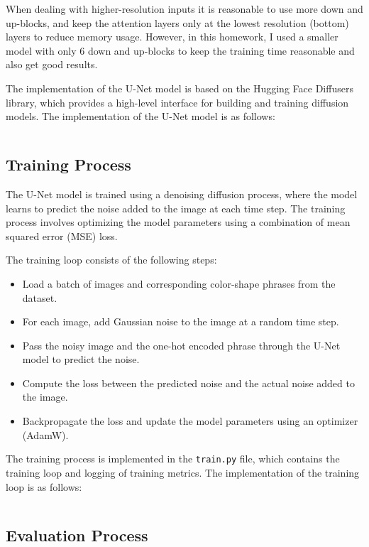 When dealing with higher-resolution inputs it is reasonable to use more down and up-blocks, and keep the attention layers only at the lowest resolution (bottom) layers to reduce memory usage.
However, in this homework, I used a smaller model with only 6 down and up-blocks to keep the training time reasonable and also get good results.

The implementation of the U-Net model is based on the Hugging Face Diffusers library, which provides a high-level interface for building and training diffusion models. The implementation of the U-Net model is as follows:

\inputminted[firstline=5]{python}{../src/model.py}

\subsection{Training Process}
\label{sec:training_process}

The U-Net model is trained using a denoising diffusion process, where the model learns to predict the noise added to the image at each time step. The training process involves optimizing the model parameters using a combination of mean squared error (MSE) loss.

The training loop consists of the following steps:
\begin{itemize}
    \item Load a batch of images and corresponding color-shape phrases from the dataset.
    \item For each image, add Gaussian noise to the image at a random time step.
    \item Pass the noisy image and the one-hot encoded phrase through the U-Net model to predict the noise.
    \item Compute the loss between the predicted noise and the actual noise added to the image.
    \item Backpropagate the loss and update the model parameters using an optimizer (AdamW).
\end{itemize}

The training process is implemented in the \texttt{train.py} file, which contains the training loop and logging of training metrics. The implementation of the training loop is as follows:
\inputminted[firstline=16,lastline=138,highlightlines=78-114]{python}{../src/train.py}

\subsection{Evaluation Process}
\label{sec:evaluation_process}

